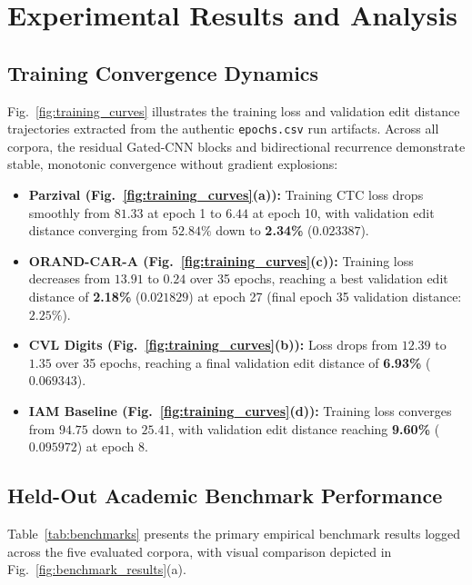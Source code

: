 \documentclass{IEEEtran}
\begin{document}
\section{Experimental Results and Analysis}

\label{sec:results}

\subsection{Training Convergence Dynamics}

Fig.~\ref{fig:training_curves} illustrates the training loss and validation edit distance trajectories extracted from the authentic \texttt{epochs.csv} run artifacts. Across all corpora, the residual Gated-CNN blocks and bidirectional recurrence demonstrate stable, monotonic convergence without gradient explosions:

\begin{itemize}

    \item \textbf{Parzival (Fig.~\ref{fig:training_curves}(a)):} Training CTC loss drops smoothly from $81.33$ at epoch 1 to $6.44$ at epoch 10, with validation edit distance converging from $52.84\%$ down to \textbf{2.34\%} ($0.023387$).

    \item \textbf{ORAND-CAR-A (Fig.~\ref{fig:training_curves}(c)):} Training loss decreases from $13.91$ to $0.24$ over 35 epochs, reaching a best validation edit distance of \textbf{2.18\%} ($0.021829$) at epoch 27 (final epoch 35 validation distance: $2.25\%$).

    \item \textbf{CVL Digits (Fig.~\ref{fig:training_curves}(b)):} Loss drops from $12.39$ to $1.35$ over 35 epochs, reaching a final validation edit distance of \textbf{6.93\%} ($0.069343$).

    \item \textbf{IAM Baseline (Fig.~\ref{fig:training_curves}(d)):} Training loss converges from $94.75$ down to $25.41$, with validation edit distance reaching \textbf{9.60\%} ($0.095972$) at epoch 8.

\end{itemize}

\subsection{Held-Out Academic Benchmark Performance}

Table~\ref{tab:benchmarks} presents the primary empirical benchmark results logged across the five evaluated corpora, with visual comparison depicted in Fig.~\ref{fig:benchmark_results}(a).
\end{document}
